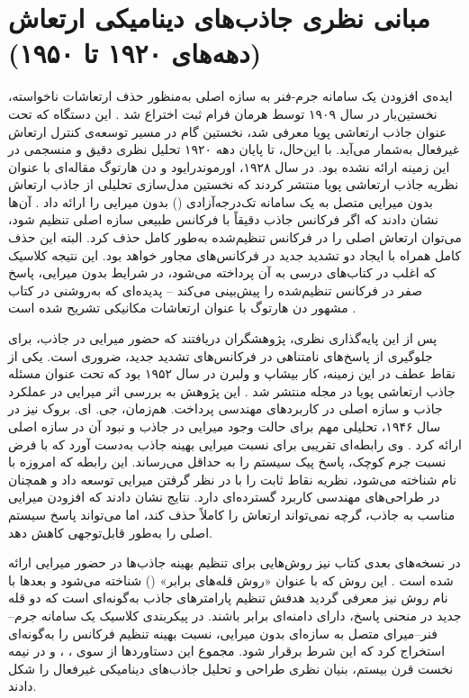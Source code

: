 
\section{مبانی نظری جاذب‌های دینامیکی ارتعاش (دهه‌های ۱۹۲۰ تا ۱۹۵۰)}

ایده‌ی افزودن یک سامانه جرم-فنر به سازه اصلی به‌منظور حذف ارتعاشات ناخواسته، نخستین‌بار در سال ۱۹۰۹ توسط هرمان فرام ثبت اختراع شد \cite{frahm1911device}. این دستگاه که تحت عنوان جاذب ارتعاشی پویا معرفی شد، نخستین گام در مسیر توسعه‌ی کنترل ارتعاش غیرفعال به‌شمار می‌آید. با این‌حال، تا پایان دهه ۱۹۲۰ تحلیل نظری دقیق و منسجمی در این زمینه ارائه نشده بود. در سال ۱۹۲۸، اورموندرایود و دن هارتوگ مقاله‌ای با عنوان نظریه جاذب ارتعاشی پویا منتشر کردند که نخستین مدل‌سازی تحلیلی از جاذب ارتعاش بدون میرایی متصل به یک سامانه تک‌درجه‌آزادی () بدون میرایی را ارائه داد \cite{ormondroyd1928theory}. آن‌ها نشان دادند که اگر فرکانس جاذب دقیقاً با فرکانس طبیعی سازه اصلی تنظیم شود، می‌توان ارتعاش اصلی را در فرکانس تنظیم‌شده به‌طور کامل حذف کرد. البته این حذف کامل همراه با ایجاد دو تشدید جدید در فرکانس‌های مجاور خواهد بود. این نتیجه کلاسیک که اغلب در کتاب‌های درسی به آن پرداخته می‌شود، در شرایط بدون میرایی، پاسخ صفر در فرکانس تنظیم‌شده را پیش‌بینی می‌کند – پدیده‌ای که به‌روشنی در کتاب مشهور دن هارتوگ با عنوان ارتعاشات مکانیکی تشریح شده است \cite{den1985mechanical}.

پس از این پایه‌گذاری نظری، پژوهشگران دریافتند که حضور میرایی در جاذب، برای جلوگیری از پاسخ‌های نامتناهی در فرکانس‌های تشدید جدید، ضروری است. یکی از نقاط عطف در این زمینه، کار بیشاپ و ولبرن در سال ۱۹۵۲ بود که تحت عنوان مسئله جاذب ارتعاشی پویا در مجله  منتشر شد \cite{bishop1952problem}. این پژوهش به بررسی اثر میرایی در عملکرد جاذب و سازه اصلی در کاربردهای مهندسی پرداخت. هم‌زمان، جی. ای. بروک نیز در سال ۱۹۴۶، تحلیلی مهم برای حالت وجود میرایی در جاذب و نبود آن در سازه اصلی ارائه کرد \cite{brock1946note}. وی رابطه‌ای تقریبی برای نسبت میرایی بهینه جاذب به‌دست آورد که با فرض نسبت جرم کوچک، پاسخ پیک سیستم را به حداقل می‌رساند. این رابطه که امروزه با نام  شناخته می‌شود، نظریه نقاط ثابت  را با در نظر گرفتن میرایی توسعه داد و همچنان در طراحی‌های مهندسی کاربرد گسترده‌ای دارد. نتایج  نشان دادند که افزودن میرایی مناسب به جاذب، گرچه نمی‌تواند ارتعاش را کاملاً حذف کند، اما می‌تواند پاسخ سیستم اصلی را به‌طور قابل‌توجهی کاهش دهد.

در نسخه‌های بعدی کتاب  نیز روش‌هایی برای تنظیم بهینه جاذب‌ها در حضور میرایی ارائه شده است \cite{den1985mechanical}. این روش که با عنوان «روش قله‌های برابر» () شناخته می‌شود  و بعدها با نام روش  نیز معرفی گردید هدفش تنظیم پارامترهای جاذب به‌گونه‌ای است که دو قله جدید در منحنی پاسخ، دارای دامنه‌ای برابر باشند. در پیکربندی کلاسیک یک سامانه جرم–فنر–میرای متصل به سازه‌ای بدون میرایی،  نسبت بهینه تنظیم فرکانس را به‌گونه‌ای استخراج کرد که این شرط برقرار شود. مجموع این دستاوردها از سوی ، ،  و  در نیمه نخست قرن بیستم، بنیان نظری طراحی و تحلیل جاذب‌های دینامیکی غیرفعال را شکل دادند.

